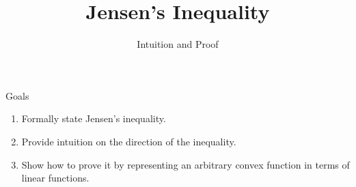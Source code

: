 \documentclass[10pt]{beamer}
\title{Jensen's Inequality}
\subtitle{Intuition and Proof}
\begin{document}
\maketitle


\begin{frame}{Goals}
\begin{enumerate}
	\item Formally state Jensen's inequality.
	\item Provide intuition on the direction of the inequality.
	\item Show how to prove it by representing an arbitrary \alert{convex} function in terms of \alert{linear} functions.
\end{enumerate}
	
\end{frame}
\end{document}
